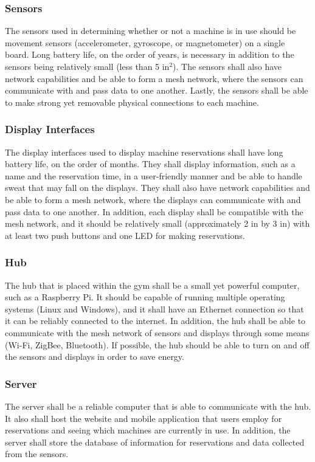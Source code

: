 \documentclass[PPFS.tex]{template/subfiles}
\begin{document}
\subsubsection{Sensors}
The sensors used in determining whether or not a machine is in use should be movement sensors (accelerometer, gyroscope, or magnetometer) on a single board. Long battery life, on the order of years, is necessary in addition to the sensors being relatively small (less than 5 in$^2$). The sensors shall also have network capabilities and be able to form a mesh network, where the sensors can communicate with and pass data to one another. Lastly, the sensors shall be able to make strong yet removable physical connections to each machine.

\subsubsection{Display Interfaces}
The display interfaces used to display machine reservations shall have long battery life, on the order of months. They shall display information, such as a name and the reservation time, in a user-friendly manner and be able to handle sweat that may fall on the displays. They shall also have network capabilities and be able to form a mesh network, where the displays can communicate with and pass data to one another. In addition, each display shall be compatible with the mesh network, and it should be relatively small (approximately 2 in by 3 in) with at least two push buttons and one LED for making reservations.

\subsubsection{Hub}
The hub that is placed within the gym shall be a small yet powerful computer, such as a Raspberry Pi. It should be capable of running multiple operating systems (Linux and Windows), and it shall have an Ethernet connection so that it can be reliably connected to the internet. In addition, the hub shall be able to communicate with the mesh network of sensors and displays through some means (Wi-Fi, ZigBee, Bluetooth). If possible, the hub should be able to turn on and off the sensors and displays in order to save energy.

\subsubsection{Server}
The server shall be a reliable computer that is able to communicate with the hub. It also shall host the website and mobile application that users employ for reservations and seeing which machines are currently in use. In addition, the server shall store the database of information for reservations and data collected from the sensors.
\end{document}
